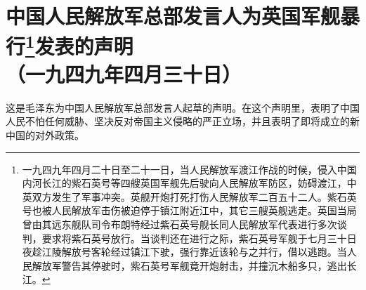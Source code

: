 \documentclass[cn,11pt,chinese]{elegantbook}
\def\myformat#1{\hfil\hfil #1}
\begin{document}
\newpage\section*{\myformat{中国人民解放军总部发言人为英国军舰暴行\footnote[1]{ 一九四九年四月二十日至二十一日，当人民解放军渡江作战的时候，侵入中国内河长江的紫石英号等四艘英国军舰先后驶向人民解放军防区，妨碍渡江，中英双方发生了军事冲突。英舰开炮打死打伤人民解放军二百五十二人。紫石英号也被人民解放军击伤被迫停于镇江附近江中，其它三艘英舰逃走。英国当局曾由其远东舰队司令布朗特经过紫石英号舰长同人民解放军代表进行多次谈判，要求将紫石英号放行。当谈判还在进行之际，紫石英号军舰于七月三十日夜趁江陵解放号客轮经过镇江下驶，强行靠近该轮与之并行，借以逃跑。当人民解放军警告其停驶时，紫石英号军舰竟开炮射击，并撞沉木船多只，逃出长江。}发表的声明}\\\myformat{（一九四九年四月三十日）}}
\begin{introduction}
\item 这是毛泽东为中国人民解放军总部发言人起草的声明。在这个声明里，表明了中国人民不怕任何威胁、坚决反对帝国主义侵略的严正立场，并且表明了即将成立的新中国的对外政策。
\end{introduction}
\end{document}
